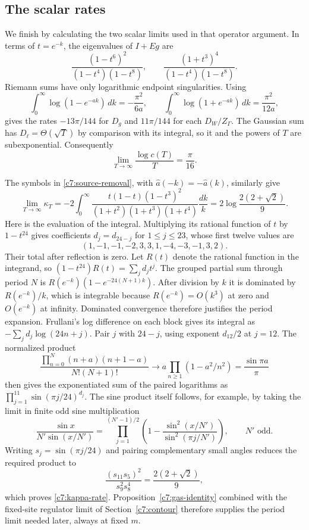 \subsection{The scalar rates}

We finish by calculating the two scalar limits used in that operator
argument.  In terms of $t=e^{-k}$, the eigenvalues of $I+Eg$ are
\[
\frac{(1-t^6)^2}{(1-t^4)(1-t^8)},\qquad
\frac{(1+t^3)^4}{(1-t^4)(1-t^8)}.
\]
Riemann sums have only logarithmic endpoint singularities.  Using
\[
\int_0^\infty\log(1-e^{-ak})\,dk=-\frac{\pi^2}{6a},\qquad
\int_0^\infty\log(1+e^{-ak})\,dk=\frac{\pi^2}{12a},
\]
gives the rates $-13\pi/144$ for $D_g$ and $11\pi/144$ for each
$D_W/Z_\Gamma$.  The Gaussian sum has $D_\ell=\Theta(\sqrt T)$ by comparison
with its integral, so it and the powers of $T$ are subexponential.  Consequently
\begin{equation}\label{c7:c-rate}
\lim_{T\to\infty}\frac{\log c(T)}{T}=\frac\pi{16}.
\end{equation}

The symbols in \eqref{c7:source-removal}, with
$\widehat a(-k)=-\widehat a(k)$, similarly give
\begin{equation}\label{c7:kappa-rate}
\lim_{T\to\infty}\kappa_T
=-2\int_0^\infty
 \frac{t(1-t)(1-t^3)^2}{(1+t^2)(1+t^3)(1+t^4)}\frac{dk}{k}
=2\log\frac{2(2+\sqrt2)}9.
\end{equation}
Here is the evaluation of the integral.  Multiplying its rational function
of $t$ by $1-t^{24}$ gives coefficients $d_j=d_{24-j}$ for $1\le j\le23$,
whose first twelve values are
\[
(1,-1,-1,-2,3,3,1,-4,-3,-1,3,2).
\]
Their total after reflection is zero.  Let $R(t)$ denote the rational
function in the integrand, so $(1-t^{24})R(t)=\sum_jd_jt^j$.  The grouped
partial sum through period $N$ is
$R(e^{-k})(1-e^{-24(N+1)k})$.  After division by $k$ it is dominated by
$R(e^{-k})/k$, which is integrable because $R(e^{-k})=O(k^3)$ at zero and
$O(e^{-k})$ at infinity.  Dominated convergence therefore justifies the
period expansion.  Frullani's log difference on each block gives its
integral as $-\sum_jd_j\log(24n+j)$.  Pair $j$ with $24-j$,
using exponent $d_{12}/2$ at $j=12$.  The normalized product
\[
\frac{\prod_{n=0}^N(n+a)(n+1-a)}{N!(N+1)!}
\longrightarrow a\prod_{n\ge1}(1-a^2/n^2)=\frac{\sin\pi a}{\pi}
\]
then gives the exponentiated sum of the paired logarithms as
$\prod_{j=1}^{11}\sin(\pi j/24)^{d_j}$.  The sine product itself follows,
for example, by taking the limit in finite odd sine multiplication
\[
\frac{\sin x}{N'\sin(x/N')}=
\prod_{j=1}^{(N'-1)/2}
 \left(1-\frac{\sin^2(x/N')}{\sin^2(\pi j/N')}\right),
\qquad N'\text{ odd}.
\]
Writing $s_j=\sin(\pi j/24)$ and pairing complementary small angles reduces
the required product to
\[
\frac{(s_{11}s_5)^2}{s_9^2s_8^4}=
\frac{2(2+\sqrt2)}9,
\]
which proves \eqref{c7:kappa-rate}.  Proposition~\ref{c7:gas-identity}
combined with the fixed-site regulator limit of Section~\ref{c7:contour}
therefore supplies the period limit needed later, always at fixed $m$.
